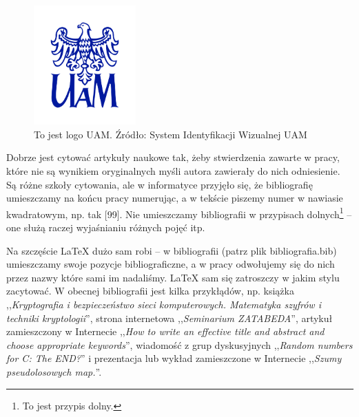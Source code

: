 \documentclass[12pt,a4paper,leqno,oneside,titlepage]{book}
\begin{document}
\begin{figure}[h!]
  \centering
    \includegraphics[width=0.35\textwidth]{logo_wersja-podstawowa_granat_1.jpg}
  \caption{To jest logo UAM. Źródło: System Identyfikacji Wizualnej UAM \cite{SIW}}
\end{figure}

Dobrze jest cytować artykuły naukowe tak, żeby stwierdzenia zawarte w pracy, które nie są wynikiem oryginalnych myśli autora zawierały do nich odniesienie. Są różne szkoły cytowania, ale w informatyce przyjęło się, że bibliografię umieszczamy na końcu pracy numerując, a w tekście piszemy numer w nawiasie kwadratowym, np. tak [99]. Nie umieszczamy bibliografii w przypisach dolnych\footnote{To jest przypis dolny.} -- one służą raczej wyjaśnianiu różnych pojęć itp.

Na szczęście \LaTeX{} dużo sam robi -- w bibliografii (patrz plik bibliografia.bib) umieszczamy swoje pozycje bibliograficzne, a w pracy odwołujemy się do nich przez nazwy które sami im nadaliśmy. \LaTeX{} sam się zatroszczy w jakim stylu zacytować. W obecnej bibliografii jest kilka przykłądów, np. książka ,,\textit{Kryptografia i bezpieczeństwo sieci komputerowych. Matematyka szyfrów i techniki kryptologii}''\cite{Stallings11kryptografia}, strona internetowa ,,\textit{Seminarium ZATABEDA}''\cite{Gogolewski13seminarium}, artykuł zamieszczony w Internecie ,,\textit{How to write an effective title and abstract and choose appropriate keywords}''\cite{Rodrigues13howtowrite}, wiadomość z grup dyskusyjnych ,,\textit{Random numbers for C: The END?}''\cite{Marsaglia99randomnum} i prezentacja lub wykład zamieszczone w Internecie ,,\textit{Szumy pseudolosowych map.}''\cite{Hanc15szumy}.\\
\end{document}
